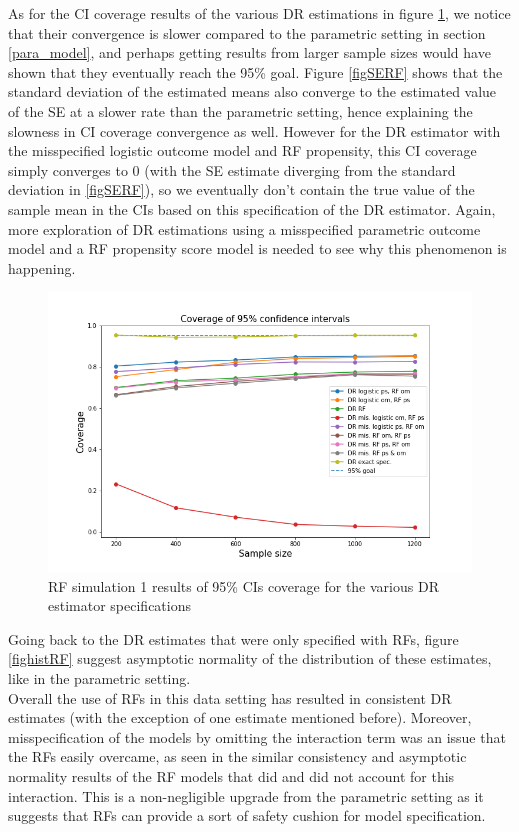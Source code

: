 \documentclass[12pt,twoside]{article}
\begin{document}
As for the CI coverage results of the various DR estimations in figure \ref{figCIRF}, we notice that their convergence is slower compared to the parametric setting in section \ref{para_model}, and perhaps getting results from larger sample sizes would have shown that they eventually reach the 95\% goal. Figure \ref{figSERF} shows that the standard deviation of the estimated means also converge to the estimated value of the SE at a slower rate than the parametric setting, hence explaining the slowness in CI coverage convergence as well. However for the DR estimator with the misspecified logistic outcome model and RF propensity, this CI coverage simply converges to 0 (with the SE estimate diverging from the standard deviation in \ref{figSERF}), so we eventually don't contain the true value of the sample mean in the CIs based on this specification of the DR estimator. Again, more exploration of DR estimations using a misspecified parametric outcome model and a RF propensity score model is needed to see why this phenomenon is happening.

\begin{figure}[h!]
    \centering
    \includegraphics[width = 0.9\columnwidth]{figures/CIRF.png}
    \caption{RF simulation 1 results of 95\% CIs coverage for the various DR estimator specifications}
    \label{figCIRF}
\end{figure}

Going back to the DR estimates that were only specified with RFs, figure \ref{fighistRF} suggest asymptotic normality of the distribution of these estimates, like in the parametric setting. \\

Overall the use of RFs in this data setting has resulted in consistent DR estimates (with the exception of one estimate mentioned before). Moreover, misspecification of the models by omitting the interaction term was an issue that the RFs easily overcame, as seen in the similar consistency and asymptotic normality results of the RF models that did and did not account for this interaction. This is a non-negligible upgrade from the parametric setting as it suggests that RFs can provide a sort of safety cushion for model specification.
\end{document}

